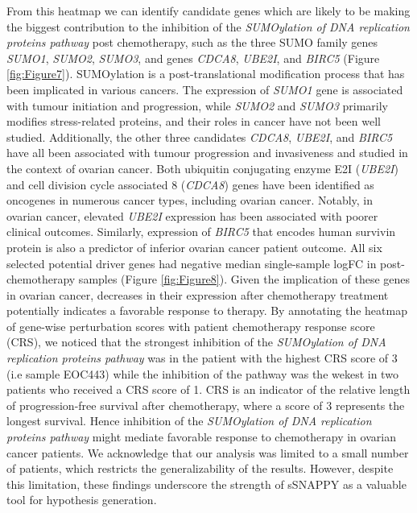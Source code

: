 \documentclass[9pt,a4paper,]{extarticle}
\begin{document}
From this heatmap we can identify candidate genes which are likely to be making the biggest contribution to the inhibition of the \emph{SUMOylation of DNA replication proteins pathway} post chemotherapy, such as the three SUMO family genes \emph{SUMO1}, \emph{SUMO2}, \emph{SUMO3}, and genes \emph{CDCA8}, \emph{UBE2I}, and \emph{BIRC5} (Figure \ref{fig:Figure7}).
SUMOylation is a post-translational modification process that has been implicated in various cancers\citep{Hu2019}.
The expression of \emph{SUMO1} gene is associated with tumour initiation and progression, while \emph{SUMO2} and \emph{SUMO3} primarily modifies stress-related proteins, and their roles in cancer have not been well studied\citep{Hu2019}.
Additionally, the other three candidates \emph{CDCA8}, \emph{UBE2I}, and \emph{BIRC5} have all been associated with tumour progression and invasiveness and studied in the context of ovarian cancer.
Both ubiquitin conjugating enzyme E2I (\emph{UBE2I}) and cell division cycle associated 8 (\emph{CDCA8}) genes have been identified as oncogenes in numerous cancer types, including ovarian cancer\citep{Dong2013, qi2021}.
Notably, in ovarian cancer, elevated \emph{UBE2I} expression has been associated with poorer clinical outcomes\citep{Zou2020}.
Similarly, expression of \emph{BIRC5} that encodes human survivin protein is also a predictor of inferior ovarian cancer patient outcome\citep{Gasowska-Bajger2021}.
All six selected potential driver genes had negative median single-sample logFC in post-chemotherapy samples (Figure \ref{fig:Figure8}).
Given the implication of these genes in ovarian cancer, decreases in their expression after chemotherapy treatment potentially indicates a favorable response to therapy.
By annotating the heatmap of gene-wise perturbation scores with patient chemotherapy response score (CRS), we noticed that the strongest inhibition of the \emph{SUMOylation of DNA replication proteins pathway} was in the patient with the highest CRS score of 3 (i.e sample EOC443) while the inhibition of the pathway was the wekest in two patients who received a CRS score of 1.
CRS is an indicator of the relative length of progression-free survival after chemotherapy, where a score of 3 represents the longest survival\citep{Michaan2018}.
Hence inhibition of the \emph{SUMOylation of DNA replication proteins pathway} might mediate favorable response to chemotherapy in ovarian cancer patients.
We acknowledge that our analysis was limited to a small number of patients, which restricts the generalizability of the results.
However, despite this limitation, these findings underscore the strength of sSNAPPY as a valuable tool for hypothesis generation.
\end{document}

